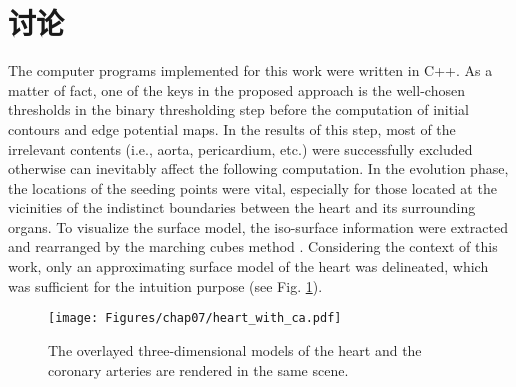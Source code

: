 \section{讨论}
\label{sec7-4}

The computer programs implemented for this work were written in C++.
As a matter of fact, one of the keys in the proposed approach is the well-chosen thresholds in the binary thresholding step before the computation of initial contours and edge potential maps. %
In the results of this step, most of the irrelevant contents (i.e., aorta, pericardium, etc.) were successfully excluded otherwise can inevitably affect the following computation.
In the evolution phase, the locations of the seeding points were vital, especially for those located at the vicinities of the indistinct boundaries between the heart and its surrounding organs. %
To visualize the surface model, the iso-surface information were extracted and rearranged by the marching cubes method \cite{Lorensen1987MC}.
Considering the context of this work, only an approximating surface model of the heart was delineated, which was sufficient for the intuition purpose (see Fig. \ref{fig:Overlay}).
\begin{figure}[t]
\centering
\texttt{[image: Figures/chap07/heart\_with\_ca.pdf]}
\caption{The overlayed three-dimensional models of the heart and the coronary arteries are rendered in the same scene.}
\label{fig:Overlay}
\end{figure}